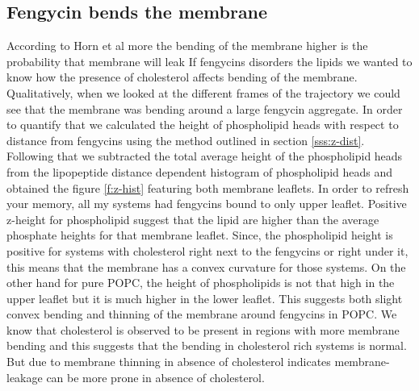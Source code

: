 \subsection{Fengycin bends the membrane}
According to Horn et al more the bending of the membrane 
higher is the probability that membrane will leak \cite{Grossfield2013}
If fengycins disorders the lipids we wanted to know how the presence of cholesterol 
affects bending of the membrane. Qualitatively, when we looked at the different 
frames of the trajectory we could see that the membrane was bending around a large 
fengycin aggregate. In order to quantify that we calculated the height of 
phospholipid heads with respect to distance from fengycins using the method outlined
in section \ref{sss:z-dist}.
Following that we subtracted the total average height of the phospholipid heads from 
the lipopeptide distance dependent histogram of phospholipid heads and obtained the figure 
\ref{f:z-hist} featuring both membrane leaflets.
In order to refresh your memory, all my systems had fengycins bound to only upper leaflet. 
 Positive z-height for phospholipid suggest that the lipid  are higher than the 
 average phosphate heights for that membrane leaflet. Since, the phospholipid height is 
 positive for systems with cholesterol right next to the fengycins or right under it, this 
 means that the membrane has a convex curvature for those systems. On the other hand for 
 pure POPC, the height of phospholipids is not that high in the upper leaflet but it is 
 much higher in the lower leaflet. This suggests both slight convex bending and thinning of
 the  membrane around fengycins in POPC.
 We know that cholesterol is observed to be present in regions with more membrane bending 
 and this suggests that the bending in cholesterol rich systems is normal. But due to 
 membrane thinning in absence of cholesterol indicates membrane-leakage can be more
 prone in absence of cholesterol.
